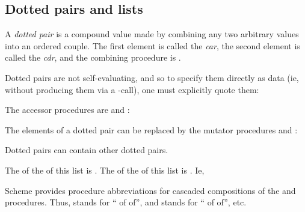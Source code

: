 {\subsection{Dotted pairs and lists}

A {\em dotted pair} is a compound value made by combining
any two arbitrary values into an ordered couple.  The
first element is called the {\em car}, the second
element is called the {\em cdr}, and the combining
procedure is .


\n Dotted pairs are not self-evaluating, and so to specify
them directly as data (ie, without producing them via
a -call), one must explicitly quote them:


\n The accessor procedures are  and :



\n The elements of a dotted pair can be replaced by the
mutator procedures  and :


\n Dotted pairs can contain other dotted pairs.


\n The  of the  of this list is .
The  of the  of this list is .
Ie,



\n Scheme provides procedure abbreviations for cascaded
compositions of the  and  procedures.
Thus,  stands for `` of  of'',
and  stands for `` of  of'', etc.


}
